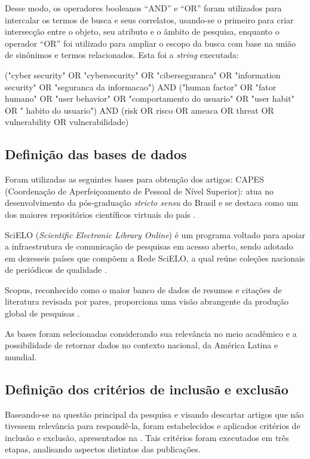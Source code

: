 \documentclass[portuguese]{textolivre}
\begin{document}
Desse modo, os operadores booleanos “AND” e “OR” foram utilizados para intercalar os termos de busca e seus correlatos, usando-se o primeiro para criar intersecção entre o objeto, seu atributo e o âmbito de pesquisa, enquanto o operador “OR” foi utilizado para ampliar o escopo da busca com base na união de sinônimos e termos relacionados. Esta foi a \textit{string} executada:

("cyber security" OR "cybersecurity" OR "ciberseguranca" OR "information security" OR "seguranca da informacao") AND ("human factor" OR "fator humano" OR "user behavior" OR "comportamento do usuario" OR "user habit" OR " habito do usuario") AND (risk OR risco OR ameaca OR threat OR vulnerability OR vulnerabilidade)

\subsection{Definição das bases de dados}\label{sec-organizacao}
Foram utilizadas as seguintes bases para obtenção dos artigos:
CAPES (Coordenação de Aperfeiçoamento de Pessoal de Nível Superior): atua no desenvolvimento da pós-graduação \textit{stricto sensu} do Brasil e se destaca como um dos maiores repositórios científicos virtuais do país \cite{coordenacao_de_aperfeicoamento_de_pessoal_de_nivel_superior_capes_quem_2023}.

SciELO (\textit{Scientific Electronic Library Online}) é um programa voltado para apoiar a infraestrutura de comunicação de pesquisas em acesso aberto, sendo adotado em dezesseis países que compõem a Rede SciELO, a qual reúne coleções nacionais de periódicos de qualidade \cite{scientific_electronic_library_online_scielo_programa_2023}.

Scopus, reconhecido como o maior banco de dados de resumos e citações de literatura revisada por pares, proporciona uma visão abrangente da produção global de pesquisas \cite{agencia_de_bibliotecas_digitais_da_universidade_de_sao_paulo_abd-sp_gravacao_2022}.

As bases foram selecionadas considerando sua relevância no meio acadêmico e a possibilidade de retornar dados no contexto nacional, da América Latina e mundial.

\subsection{Definição dos critérios de inclusão e exclusão}\label{sec-titulo}
Baseando-se na questão principal da pesquisa e visando descartar artigos que não tivessem relevância para respondê-la, foram estabelecidos e aplicados critérios de inclusão e exclusão, apresentados na . Tais critérios foram executados em três etapas, analisando aspectos distintos das publicações.
\end{document}
